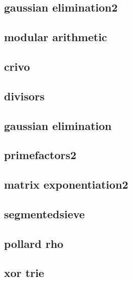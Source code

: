 \subsection{gaussian elimination2}
\raggedbottom
\hrulefill
\subsection{modular arithmetic}
\raggedbottom
\hrulefill
\subsection{crivo}
\raggedbottom
\hrulefill
\subsection{divisors}
\raggedbottom
\hrulefill
\subsection{gaussian elimination}
\raggedbottom
\hrulefill
\subsection{primefactors2}
\raggedbottom
\hrulefill
\subsection{matrix exponentiation2}
\raggedbottom
\hrulefill
\subsection{segmentedsieve}
\raggedbottom
\hrulefill
\subsection{pollard rho}
\raggedbottom
\hrulefill
\subsection{xor trie}
\raggedbottom
\hrulefill

